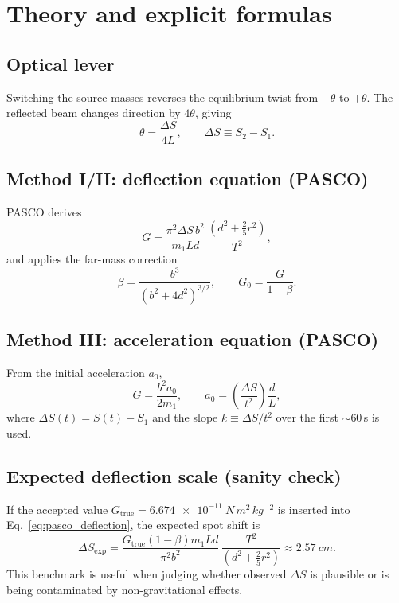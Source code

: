 \documentclass[11pt]{article}
\begin{document}
\section{Theory and explicit formulas}
\subsection*{Optical lever}
Switching the source masses reverses the equilibrium twist from $-\theta$ to $+\theta$.
The reflected beam changes direction by $4\theta$, giving
\begin{equation}
\theta = \frac{\Delta S}{4L},\qquad \Delta S\equiv S_2-S_1 .
\label{eq:theta}
\end{equation}

\subsection*{Method I/II: deflection equation (PASCO)}
PASCO derives
\begin{equation}
G=\frac{\pi^2 \Delta S\, b^2}{m_1 L d}\,
\frac{\left(d^2+\frac{2}{5}r^2\right)}{T^2},
\label{eq:pasco_deflection}
\end{equation}
and applies the far-mass correction
\begin{equation}
\beta=\frac{b^3}{\left(b^2+4d^2\right)^{3/2}},\qquad 
G_0=\frac{G}{1-\beta}.
\label{eq:beta}
\end{equation}

\subsection*{Method III: acceleration equation (PASCO)}
From the initial acceleration $a_0$,
\begin{equation}
G=\frac{b^2 a_0}{2m_1},\qquad
a_0=\left(\frac{\Delta S}{t^2}\right)\frac{d}{L},
\label{eq:method3}
\end{equation}
where $\Delta S(t)=S(t)-S_1$ and the slope $k\equiv \Delta S/t^2$ over the first $\sim$60\,s is used.

\subsection*{Expected deflection scale (sanity check)}
If the accepted value $G_{\mathrm{true}}=\SI{6.674e-11}{N\,m^2\,kg^{-2}}$ is inserted into Eq.~\eqref{eq:pasco_deflection}, the expected spot shift is
\begin{equation}
\Delta S_{\mathrm{exp}} = \frac{G_{\mathrm{true}}(1-\beta)m_1 L d}{\pi^2 b^2}\,
\frac{T^2}{\left(d^2+\frac{2}{5}r^2\right)}\approx \SI{2.57}{cm}.
\label{eq:deltaS_expected}
\end{equation}
This benchmark is useful when judging whether observed $\Delta S$ is plausible or is being contaminated by non-gravitational effects.
\end{document}
